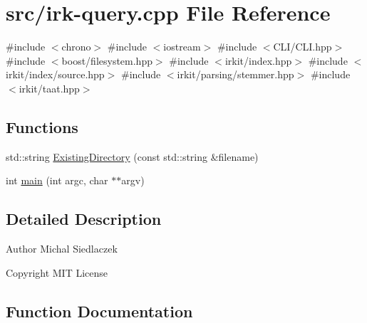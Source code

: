 \hypertarget{irk-query_8cpp}{}\section{src/irk-\/query.cpp File Reference}
\label{irk-query_8cpp}
{\ttfamily \#include $<$chrono$>$}\newline
{\ttfamily \#include $<$iostream$>$}\newline
{\ttfamily \#include $<$C\+L\+I/\+C\+L\+I.\+hpp$>$}\newline
{\ttfamily \#include $<$boost/filesystem.\+hpp$>$}\newline
{\ttfamily \#include $<$irkit/index.\+hpp$>$}\newline
{\ttfamily \#include $<$irkit/index/source.\+hpp$>$}\newline
{\ttfamily \#include $<$irkit/parsing/stemmer.\+hpp$>$}\newline
{\ttfamily \#include $<$irkit/taat.\+hpp$>$}\newline
\subsection*{Functions}
\begin{DoxyCompactItemize}
\item 
std\+::string \mbox{\hyperlink{irk-query_8cpp_afd82ae1865bcd245c4e6918a4d991b9e}{Existing\+Directory}} (const std\+::string \&filename)
\item 
int \mbox{\hyperlink{irk-query_8cpp_a3c04138a5bfe5d72780bb7e82a18e627}{main}} (int argc, char $\ast$$\ast$argv)
\end{DoxyCompactItemize}


\subsection{Detailed Description}
\begin{DoxyAuthor}{Author}
Michal Siedlaczek 
\end{DoxyAuthor}
\begin{DoxyCopyright}{Copyright}
M\+IT License 
\end{DoxyCopyright}


\subsection{Function Documentation}
\mbox{\label{irk-query_8cpp_afd82ae1865bcd245c4e6918a4d991b9e}} 
